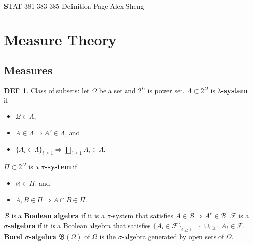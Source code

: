 \documentclass[hidelinks,11pt]{article}
\theoremstyle{definition}
\newtheorem*{defin}{DEF}
\theoremstyle{dotless}
\theoremstyle{remark}
\DeclareMathOperator{\1}{\mathbf{1}}
\begin{document}
\begin{center}
{\Large\textbf STAT 381-383-385 \hspace{0.1cm} Definition Page}\medbreak
\large{Alex Sheng}
\end{center}

\section{Measure Theory}

\subsection{Measures}
\begin{defin}
Class of subsets: let $\Omega$ be a set and $2^\Omega$ is power set.\newline
$\Lambda\subset2^\Omega$ is \textbf{$\lambda$-system} if\begin{itemize}
    \item $\Omega\in\Lambda$,
    \item $A\in\Lambda\Rightarrow A^c\in\Lambda$, and
    \item $\{A_i\in\Lambda\}_{i\geq1}\Rightarrow\amalg_{i\geq1}A_i\in\Lambda$.
\end{itemize}
$\Pi\subset2^\Omega$ is a \textbf{$\pi$-system} if\begin{itemize}
    \item $\varnothing\in\Pi$, and
    \item $A,B\in\Pi\Rightarrow A\cap B\in\Pi$.
\end{itemize}
$\mathcal{B}$ is a \textbf{Boolean algebra} if it is a $\pi$-system that satisfies $A\in\mathcal{B}\Rightarrow A^c\in\mathcal{B}$.\newline
$\mathcal{F}$ is a \textbf{$\sigma$-algebra} if it is a Boolean algebra that satisfies $\{A_i\in\mathcal{F}\}_{i\geq1}\Rightarrow\cup_{i\geq1}A_i\in\mathcal{F}$.\newline
\textbf{Borel $\sigma$-algebra} $\mathfrak{B}(\Omega)$ of $\Omega$ is the $\sigma$-algebra generated by open sets of $\Omega$.
\end{defin}
\end{document}
